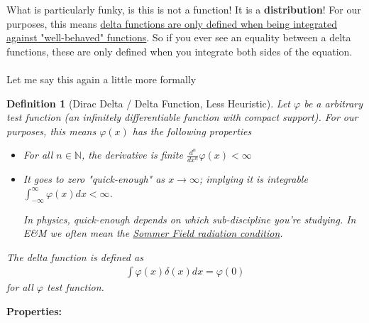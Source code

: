\documentclass[12pt,fleqn]{article}
\numberwithin{equation}{section} %
\newtheorem{definition}{Definition}
\begin{document}
What is particularly funky, is this is not a function! It is a \textbf{distribution}! For our purposes, this means \underline{delta functions are only defined when being integrated against "well-behaved" functions}. So if you ever see an equality between a delta functions, these are only defined when you integrate both sides of the equation.\\
\\
Let me say this again a little more formally
\begin{definition}[Dirac Delta / Delta Function, Less Heuristic] Let $\varphi$ be a arbitrary test function (an infinitely differentiable function with compact support). For our purposes, this means $\varphi(x)$ has the following properties
\begin{itemize}
	\item For all $n \in \mathbb N$, the derivative is finite $\frac{d^n}{dx^n}\varphi(x) < \infty$ 
	\item It goes to zero "quick-enough" as $x \to \infty$; implying it is integrable $\int_{-\infty}^\infty \varphi(x) dx < \infty$.
	\begin{sidework}
		In physics, quick-enough depends on which sub-discipline you're studying. In E\&M we often mean the \href{https://en.wikipedia.org/wiki/Sommerfeld_radiation_condition}{Sommer Field radiation condition}. 
	\end{sidework}
\end{itemize}
The delta function is defined as
\begin{align}
	\int \varphi(x) \delta(x) dx = \varphi(0)
\end{align}
for all $\varphi$ test function.
\end{definition}
\textbf{Properties:}
\end{document}
